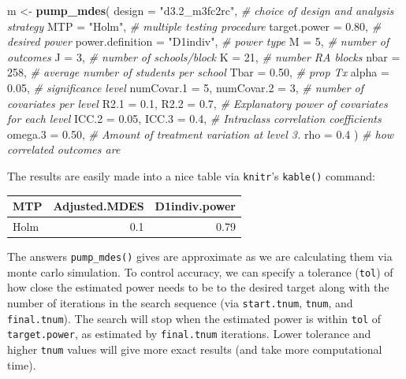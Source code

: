 \documentclass[
]{article}
\newenvironment{Shaded}{\begin{snugshade}}{\end{snugshade}}
\newcommand{\CommentTok}[1]{\textcolor[rgb]{0.56,0.35,0.01}{\textit{#1}}}
\newcommand{\DataTypeTok}[1]{\textcolor[rgb]{0.13,0.29,0.53}{#1}}
\newcommand{\DecValTok}[1]{\textcolor[rgb]{0.00,0.00,0.81}{#1}}
\newcommand{\FloatTok}[1]{\textcolor[rgb]{0.00,0.00,0.81}{#1}}
\newcommand{\KeywordTok}[1]{\textcolor[rgb]{0.13,0.29,0.53}{\textbf{#1}}}
\newcommand{\NormalTok}[1]{#1}
\newcommand{\StringTok}[1]{\textcolor[rgb]{0.31,0.60,0.02}{#1}}
\begin{document}
\begin{Shaded}
\begin{Highlighting}[]
\NormalTok{m \textless{}{-}}\StringTok{ }\KeywordTok{pump\_mdes}\NormalTok{(}
            \DataTypeTok{design =} \StringTok{"d3.2\_m3fc2rc"}\NormalTok{, }\CommentTok{\# choice of design and analysis strategy}
            \DataTypeTok{MTP =} \StringTok{"Holm"}\NormalTok{, }\CommentTok{\# multiple testing procedure}
            \DataTypeTok{target.power =} \FloatTok{0.80}\NormalTok{, }\CommentTok{\# desired power}
            \DataTypeTok{power.definition =} \StringTok{"D1indiv"}\NormalTok{, }\CommentTok{\# power type}
            \DataTypeTok{M =} \DecValTok{5}\NormalTok{, }\CommentTok{\# number of outcomes}
            \DataTypeTok{J =} \DecValTok{3}\NormalTok{, }\CommentTok{\# number of schools/block}
            \DataTypeTok{K =} \DecValTok{21}\NormalTok{, }\CommentTok{\# number RA blocks}
            \DataTypeTok{nbar =} \DecValTok{258}\NormalTok{, }\CommentTok{\# average number of students per school}
            \DataTypeTok{Tbar =} \FloatTok{0.50}\NormalTok{, }\CommentTok{\# prop Tx}
            \DataTypeTok{alpha =} \FloatTok{0.05}\NormalTok{, }\CommentTok{\# significance level}
            \DataTypeTok{numCovar.1 =} \DecValTok{5}\NormalTok{, }\DataTypeTok{numCovar.2 =} \DecValTok{3}\NormalTok{, }\CommentTok{\# number of covariates per level}
            \DataTypeTok{R2.1 =} \FloatTok{0.1}\NormalTok{, }\DataTypeTok{R2.2 =} \FloatTok{0.7}\NormalTok{, }\CommentTok{\# Explanatory power of covariates for each level}
            \DataTypeTok{ICC.2 =} \FloatTok{0.05}\NormalTok{, }\DataTypeTok{ICC.3 =} \FloatTok{0.4}\NormalTok{, }\CommentTok{\# Intraclass correlation coefficients}
            \DataTypeTok{omega.3 =} \FloatTok{0.50}\NormalTok{, }\CommentTok{\# Amount of treatment variation at level 3.}
            \DataTypeTok{rho =} \FloatTok{0.4}\NormalTok{ ) }\CommentTok{\# how correlated outcomes are}
\end{Highlighting}
\end{Shaded}

The results are easily made into a nice table via \texttt{knitr}'s
\texttt{kable()} command:

\begin{tabular}{l|r|r}
\hline
MTP & Adjusted.MDES & D1indiv.power\\
\hline
Holm & 0.1 & 0.79\\
\hline
\end{tabular}

The answers \texttt{pump\_mdes()} gives are approximate as we are
calculating them via monte carlo simulation. To control accuracy, we can
specify a tolerance (\texttt{tol}) of how close the estimated power
needs to be to the desired target along with the number of iterations in
the search sequence (via \texttt{start.tnum}, \texttt{tnum}, and
\texttt{final.tnum}). The search will stop when the estimated power is
within \texttt{tol} of \texttt{target.power}, as estimated by
\texttt{final.tnum} iterations. Lower tolerance and higher \texttt{tnum}
values will give more exact results (and take more computational time).
\end{document}

